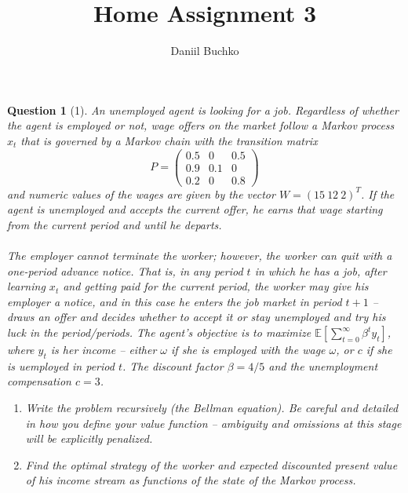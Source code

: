 \documentclass[12pt,reqno]{amsart}
\title{Home Assignment 3}
\author{Daniil Buchko}
\theoremstyle{plain}
\newcommand{\E}{\mathbb{E}}
\newtheorem*{theorem*}{Question}
\begin{document}
\maketitle

\begin{theorem*}[1]
    \normalfont
    An unemployed agent is looking for a job. Regardless of whether the agent is employed or not,
    wage offers on the market follow a Markov process $ x_t $ that is governed by a Markov chain
    with the transition matrix
    \[
        P = \begin{pmatrix}
            0.5 & 0   & 0.5 \\
            0.9 & 0.1 & 0   \\
            0.2 & 0   & 0.8
        \end{pmatrix}
    \]
    and numeric values of the wages are given by the vector $ W = \left( 15 ~ 12 ~ 2\right)^{T} $.
    If the agent is unemployed and accepts the current offer, he earns that wage starting from the
    current period and until he departs.
    \\\\
    The employer cannot terminate the worker; however, the worker can quit with a one-period
    advance notice. That is, in any period $ t $ in which he has a job, after learning $ x_t $ and
    getting paid for the current period, the worker may give his employer a notice, and in this case
    he enters the job market in period $ t+1 $ -- draws an offer and decides whether to accept it or
    stay unemployed and try his luck in the period/periods. The agent’s objective is to maximize
    $ \E \left[ \sum_{t=0}^{\infty} \beta^{t}y_{t} \right] $, where $ y_{t} $ is her income -- either
    $ \omega $ if she is employed with the wage $ \omega $, or $ c $ if she is uemployed in period
    $ t $.  The discount factor $ \beta=4/5 $ and the unemployment compensation $ c = 3 $.
    \begin{enumerate}
        \item Write the problem recursively (the Bellman equation). Be careful and detailed in how
              you define your value function -- ambiguity and omissions at this stage will be
              explicitly penalized.
        \item Find the optimal strategy of the worker and expected discounted present value of his
              income stream as functions of the state of the Markov process.
    \end{enumerate}
\end{theorem*}
\end{document}
